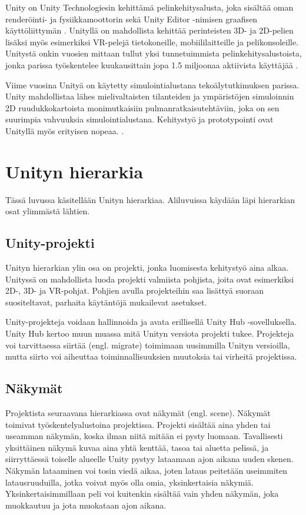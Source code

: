 \documentclass[utf8]{gradu3}
\begin{document}
Unity on Unity Technologiesin kehittämä pelinkehitysalusta, joka sisältää oman renderöinti- ja fysiikkamoottorin sekä Unity Editor -nimisen graafisen käyttöliittymän \parencite{juliani2018unity}. Unityllä on mahdollista kehittää perinteisten 3D- ja 2D-pelien lisäksi myös esimerkiksi VR-pelejä tietokoneille, mobiililaitteille ja pelikonsoleille. Unitystä onkin vuosien mittaan tullut yksi tunnetuimmista pelinkehitysalustoista, jonka parissa työskentelee kuukausittain jopa 1.5 miljoonaa aktiivista käyttäjää \parencite{unityweb}.

Viime vuosina Unityä on käytetty simulointialustana tekoälytutkimuksen parissa. Unity mahdollistaa lähes mielivaltaisten tilanteiden ja ympäristöjen simuloinnin 2D ruudukkokartoista monimutkaisiin pulmanratkaisutehtäviin, joka on sen suurimpia vahvuuksia simulointialustana. Kehitystyö ja prototypointi ovat Unityllä myös erityisen nopeaa. \parencite{juliani2018unity}.

\section{Unityn hierarkia}

Tässä luvussa käsitellään Unityn hierarkiaa. Aliluvuissa käydään läpi hierarkian osat ylimmästä lähtien.

\subsection{Unity-projekti}

Unityn hierarkian ylin osa on projekti, jonka luomisesta kehitystyö aina alkaa. Unityssä on mahdollista luoda projekti valmiista pohjista, joita ovat esimerkiksi 2D-, 3D- ja VR-pohjat. Pohjien avulla projekteihin saa lisättyä suoraan suositeltavat, parhaita käytäntöjä mukailevat asetukset.

Unity-projekteja voidaan hallinnoida ja avata erillisellä Unity Hub -sovelluksella. Unity Hub kertoo muun muassa mitä Unityn versiota projekti tukee. Projekteja voi tarvittaessa siirtää (engl. migrate) toimimaan uusimmilla Unityn versioilla, mutta siirto voi aiheuttaa toiminnallisuuksien muutoksia tai virheitä projektissa.

\subsection{Näkymät}

Projektista seuraavana hierarkiassa ovat näkymät (engl. scene). Näkymät toimivat työskentelyalustoina projektissa. Projekti sisältää aina yhden tai useamman näkymän, koska ilman niitä mitään ei pysty luomaan. Tavallisesti yksittäinen näkymä kuvaa aina yhtä kenttää, tasoa tai aluetta pelissä, ja siirryttäessä toiselle alueelle Unity pystyy lataamaan ajon aikana uuden skenen. Näkymän lataaminen voi tosin viedä aikaa, joten lataus peitetään useimmiten latausruuduilla, jotka voivat myös olla omia, yksinkertaisia näkymiä. Yksinkertaisimmillaan peli voi kuitenkin sisältää vain yhden näkymän, joka muokkautuu ja jota muokataan ajon aikana.
\end{document}
